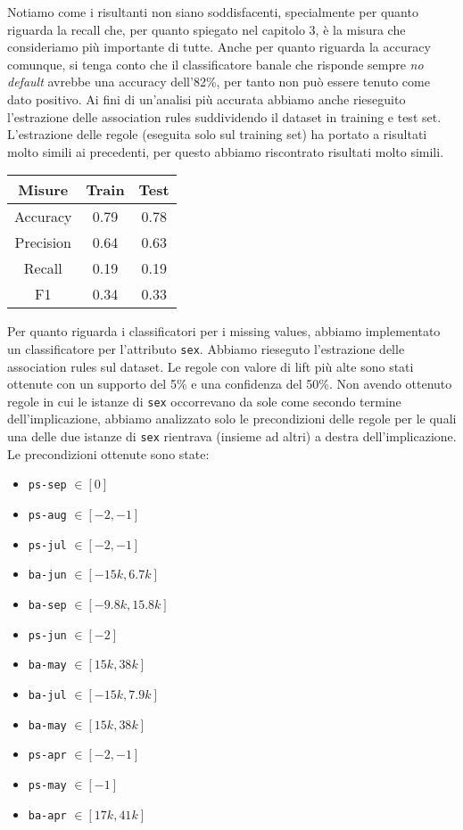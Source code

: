 Notiamo come i risultanti non siano soddisfacenti, specialmente per quanto riguarda
la recall che, per quanto spiegato nel capitolo 3, \`e la misura che consideriamo
pi\`u importante di tutte. Anche per quanto riguarda la accuracy comunque, si tenga
conto che il classificatore banale che risponde sempre \textit{no default} avrebbe
una accuracy dell'82\%, per tanto non pu\`o essere tenuto come dato positivo.
Ai fini di un'analisi pi\`u accurata abbiamo anche rieseguito l'estrazione
delle association rules suddividendo il dataset in training e test set.
L'estrazione delle regole (eseguita solo sul training set) ha portato a risultati
molto simili ai precedenti, per questo abbiamo riscontrato risultati molto simili.

\begin{center}
	\begin{tabular}{c|c|c}
		\hline
		\textbf{Misure} & \textbf{Train} & \textbf{Test}\\
		\hline
		Accuracy & 0.79 & 0.78\\
		\hline
		Precision & 0.64 & 0.63\\
		\hline
		Recall & 0.19 & 0.19\\
		\hline
		F1 & 0.34 & 0.33\\
		\hline
	\end{tabular}
\end{center}

Per quanto riguarda i classificatori per i missing values, abbiamo implementato
un classificatore per l'attributo \texttt{sex}. Abbiamo rieseguto l'estrazione
delle association rules sul dataset. Le regole con valore di lift pi\`u
alte sono stati ottenute con un supporto del 5\% e una confidenza del 50\%.
Non avendo ottenuto regole in cui le istanze di \texttt{sex} occorrevano
da sole come secondo termine dell'implicazione, abbiamo analizzato solo le
precondizioni delle regole per le quali una delle due istanze di \texttt{sex}
rientrava (insieme ad altri) a destra dell'implicazione.
Le precondizioni ottenute sono state:

\begin{itemize}
	\item \texttt{ps-sep} $\in [0]$
	\item \texttt{ps-aug} $\in [-2, -1]$
	\item \texttt{ps-jul} $\in [-2, -1]$
	\item \texttt{ba-jun} $\in [-15k, 6.7k]$
	\item \texttt{ba-sep} $\in [-9.8k, 15.8k]$
	\item \texttt{ps-jun} $\in [-2]$
	\item \texttt{ba-may} $\in [15k, 38k]$
	\item \texttt{ba-jul} $\in [-15k, 7.9k]$
	\item \texttt{ba-may} $\in [15k, 38k]$
	\item \texttt{ps-apr} $\in [-2, -1]$
	\item \texttt{ps-may} $\in [-1]$
	\item \texttt{ba-apr} $\in [17k, 41k]$
\end{itemize}

